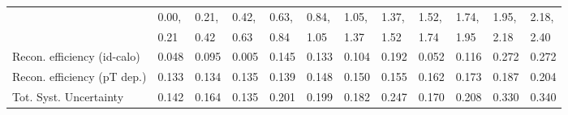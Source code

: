 \begin{tabular}{l|p{0.6cm}p{0.6cm}p{0.6cm}p{0.6cm}p{0.6cm}p{0.6cm}p{0.6cm}p{0.6cm}p{0.6cm}p{0.6cm}p{0.6cm}}
\hline
   & 0.00, & 0.21, & 0.42, & 0.63, & 0.84, & 1.05, & 1.37, & 1.52, & 1.74, & 1.95, & 2.18,  \\ 
   & 0.21 & 0.42 & 0.63 & 0.84 & 1.05 & 1.37 & 1.52 & 1.74 & 1.95 & 2.18 & 2.40  \\ 
\hline
Recon. efficiency (id-calo)              & 0.048 & 0.095 & 0.005 & 0.145 & 0.133 & 0.104 & 0.192 & 0.052 & 0.116 & 0.272 & 0.272 \\
\hline
Recon. efficiency (pT dep.)              & 0.133 & 0.134 & 0.135 & 0.139 & 0.148 & 0.150 & 0.155 & 0.162 & 0.173 & 0.187 & 0.204 \\
\hline
Tot. Syst. Uncertainty                   & 0.142 & 0.164 & 0.135 & 0.201 & 0.199 & 0.182 & 0.247 & 0.170 & 0.208 & 0.330 & 0.340 \\
\hline
\end{tabular}
